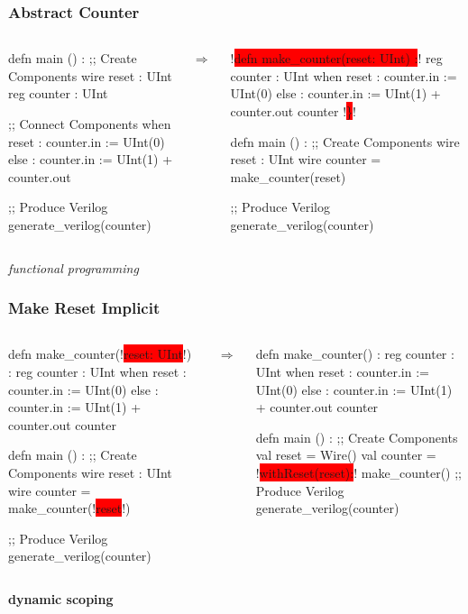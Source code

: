 \documentclass[xcolor=pdflatex,dvipsnames,table]{beamer}
\begin{document}
\begin{frame}[fragile]
\frametitle{Abstract Counter}
\begin{columns}
{
\begin{stanza}
defn main () :
  ;; Create Components
  wire reset  : UInt
  reg counter : UInt

  ;; Connect Components
  when reset :
    counter.in := UInt(0)
  else :
    counter.in := UInt(1) + counter.out

  ;; Produce Verilog
  generate_verilog(counter)
\end{stanza}
}
\begin{center}
$\Rightarrow$
\end{center}
{
\begin{stanza}
!\colorbox{red}{defn make\_counter(reset: UInt) :}!
  reg counter : UInt
  when reset :
    counter.in := UInt(0)
  else :
    counter.in := UInt(1) + counter.out
  counter
!\colorbox{red}{\}}!

defn main () :
  ;; Create Components
  wire reset  : UInt
  wire counter = make_counter(reset)

  ;; Produce Verilog
  generate_verilog(counter)
\end{stanza}
}
\end{columns}
\vspace{1cm}
{\it functional programming}
\end{frame}

\begin{frame}[fragile]
\frametitle{Make Reset Implicit}
\begin{columns}
{
\begin{stanza}
defn make_counter(!\colorbox{red}{reset: UInt}!) :
  reg counter : UInt
  when reset :
    counter.in := UInt(0)
  else :
    counter.in := UInt(1) + counter.out
  counter

defn main () :
  ;; Create Components
  wire reset  : UInt
  wire counter = make_counter(!\colorbox{red}{reset}!)

  ;; Produce Verilog
  generate_verilog(counter)
\end{stanza}
}
\begin{center}
$\Rightarrow$
\end{center}
{
\begin{stanza}
defn make_counter() :
  reg counter : UInt
  when reset :
    counter.in := UInt(0)
  else :
    counter.in := UInt(1) + counter.out
  counter

defn main () :
  ;; Create Components
  val reset   = Wire()
  val counter = 
    !\colorbox{red}{withReset(reset):}!
      make_counter()
  ;; Produce Verilog
  generate_verilog(counter)
\end{stanza}
}
\end{columns}
\vspace{1cm}
{\bf dynamic scoping}
\end{frame}
\end{document}
